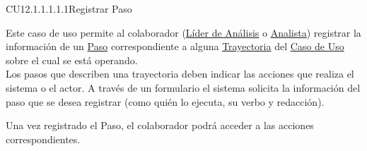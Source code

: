 	\begin{UseCase}{CU12.1.1.1.1.1}{Registrar Paso}{
			
			Este caso de uso permite al colaborador (\hyperlink{jefe}{Líder de Análisis} o \hyperlink{analista}{Analista}) registrar la información de un \hyperlink{entidadPaso}{Paso} correspondiente a alguna \hyperlink{entidadTray}{Trayectoria} del \hyperlink{casoUso}{Caso de Uso} sobre el cual se está operando.\\
			
			Los pasos que describen una trayectoria deben indicar las acciones que realiza el sistema o el actor. A través de un formulario el sistema solicita la información del paso que se desea registrar (como quién lo ejecuta, su verbo y redacción). 
			
		    Una vez registrado el Paso, el colaborador podrá acceder a las acciones correspondientes.
			
}
\end{UseCase}
